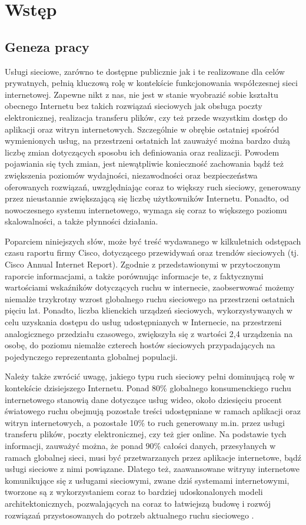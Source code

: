 \chapter{Wstęp}
\section{Geneza pracy}
Usługi sieciowe, zarówno te dostępne publicznie jak i te realizowane dla celów prywatnych, pełnią kluczową rolę w kontekście funkcjonowania współczesnej sieci internetowej. Zapewne nikt z nas, nie jest w stanie wyobrazić sobie kształtu obecnego Internetu bez takich rozwiązań sieciowych jak obsługa poczty elektronicznej, realizacja transferu plików, czy też przede wszystkim dostęp do aplikacji oraz witryn internetowych. Szczególnie w obrębie ostatniej spośród wymienionych usług, na przestrzeni ostatnich lat zauważyć można bardzo dużą liczbę zmian dotyczących sposobu ich definiowania oraz realizacji. Powodem pojawiania się tych zmian, jest niewątpliwie konieczność zachowania bądź też zwiększenia poziomów wydajności, niezawodności oraz bezpieczeństwa oferowanych rozwiązań, uwzględniając coraz to większy ruch sieciowy, generowany przez nieustannie zwiększającą się liczbę użytkowników Internetu. Ponadto, od nowoczesnego systemu internetowego, wymaga się coraz to większego poziomu skalowalności, a także płynności działania.

Poparciem niniejszych słów, może być treść wydawanego w kilkuletnich odstępach czasu raportu firmy Cisco, dotyczącego przewidywań oraz trendów sieciowych (tj. Cisco Annual Internet Report). Zgodnie z przedstawionymi w przytoczonym raporcie informacjami, a także porównując informacje te, z faktycznymi wartościami wskaźników dotyczących ruchu w internecie, zaobserwować możemy niemalże trzykrotny wzrost globalnego ruchu sieciowego na przestrzeni ostatnich pięciu lat. Ponadto, liczba klienckich urządzeń sieciowych, wykorzystywanych w celu uzyskania dostępu do usług udostępnianych w Internecie, na przestrzeni analogicznego przedziału czasowego, zwiększyła się z wartości 2,4 urządzenia na osobę, do poziomu niemalże czterech hostów sieciowych przypadających na pojedynczego reprezentanta globalnej populacji.

Należy także zwrócić uwagę, jakiego typu ruch sieciowy pełni dominującą rolę w kontekście dzisiejszego Internetu. Ponad 80\% globalnego konsumenckiego ruchu internetowego stanowią dane dotyczące usług wideo, około dziesięciu procent światowego ruchu obejmują pozostałe treści udostępniane w ramach aplikacji oraz witryn internetowych, a pozostałe 10\% to ruch generowany m.in. przez usługi transferu plików, poczty elektronicznej, czy też gier online. Na podstawie tych informacji, zauważyć można, że ponad 90\% całości danych, przesyłanych w ramach globalnej sieci, musi być przetwarzanych przez aplikacje internetowe, bądź usługi sieciowe z nimi powiązane. Dlatego też, zaawansowane witryny internetowe komunikujące się z usługami sieciowymi, zwane dziś systemami internetowymi, tworzone są z wykorzystaniem coraz to bardziej udoskonalonych modeli architektonicznych, pozwalających na coraz to łatwiejszą budowę i rozwój rozwiązań przystosowanych do potrzeb aktualnego ruchu sieciowego \cite{CAIR20182023}.

